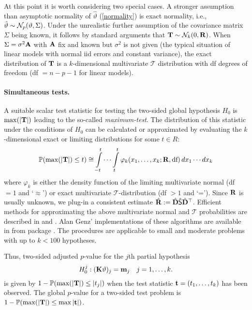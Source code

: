 \documentclass[12pt]{article}
\begin{document}
At this point it is worth
considering two special cases. A stronger assumption than asymptotic normality
of $\hat{\vartheta}$ (\ref{normality}) is exact normality, i.e., 
$\hat{\vartheta} \sim \N_p(\vartheta, \Sigma)$. Under the unrealistic
further assumption of the covariance matrix $\Sigma$ being known, it
follows by standard arguments that $\T \sim \N_k(0, \Cor)$. 
When $\Sigma = \sigma^2 \A$ with $\A$ fix and known 
but $\sigma^2$ is not given (the typical situation of linear models
with normal iid errors and constant variance), the
exact distribution of $\T$ is a $k$-dimensional multivariate $\mathcal{T}$
distribution with df degrees of freedom (df $ = n - p - 1$ for linear models).

\paragraph{Simultaneous tests.}

A suitable scalar test statistic for testing the two-sided global hypothesis 
$H_0$ is $\max(|\T|)$ leading to the so-called \emph{maximum-test}. 
The distribution of this statistic under the conditions of $H_0$
can be calculated or approximated
by evaluating the $k$-dimensional exact or limiting distributions for some $t \in R$:
\begin{eqnarray*}
\Prob(\max(|\T|) \le t)  \cong  \int\limits_{-t}^t \cdots \int\limits_{t}^t 
\varphi_k(x_1, \dots, x_k; \Cor, \text{df}) \, dx_1 \cdots dx_k 
\end{eqnarray*}
where $\varphi_k$ is either the density function of the limiting multivariate
normal (df $ = 1$ and `$\approx$') or exact multivariate $\mathcal{T}$-distribution (df $ > 1$
and `='). 
Since $\Cor$ is usually unknown, we plug-in a consistent estimate
$\hat{\Cor} := \hat{\D} \hat{\S} \hat{\D}^\top$. Efficient methods
for approximating the above multivariate normal and $\mathcal{T}$ 
probabilities are described in \cite{Genz1992,GenzBretz1999,BretzGenzHothorn2001}
and \cite{GenzBretz2002}. Alan Genz' implementations of these algorithms
are available in \RR{} from package  
\citep{pkg:mvtnorm,Rnews:Hothorn+Bretz+Genz:2001}. The procedures
are applicable to small and moderate problems with up to $k < 100$ hypotheses.

Thus, two-sided adjusted $p$-value for the $j$th partial hypothesis 
\begin{eqnarray*}
H_0^j: (\K \vartheta)_j = \m_j \quad j = 1, \dots, k.
\end{eqnarray*}
is given by $1 - \Prob(\max(|\T|) \le |t_j|)$ when the test statistic 
$\tt  = (t_1, \dots, t_k)$
has been observed. The global $p$-value for a two-sided test problem is 
$1 - \Prob(\max(|\T|) \le \max|\tt|)$.
\end{document}
